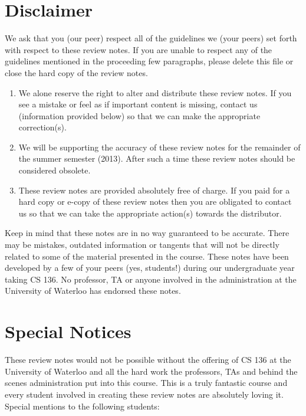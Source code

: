 \section*{Disclaimer}

We ask that you (our peer) respect all of the guidelines we (your peers) set forth with respect to these review notes. If you are unable to respect any of the guidelines mentioned in the proceeding few paragraphs, please delete this file or close the hard copy of the review notes.\\

\begin{enumerate}

\item We alone reserve the right to alter and distribute these review notes. If you see a mistake or feel as if important content is missing, contact us (information provided below) so that we can make the appropriate correction(s).

\item We will be supporting the accuracy of these review notes for the remainder of the summer semester (2013). After such a time these review notes should be considered obsolete.

\item These review notes are provided absolutely free of charge. If you paid for a hard copy or e-copy of these review notes then you are obligated to contact us so that we can take the appropriate action(s) towards the distributor.

\end{enumerate}

Keep in mind that these notes are in no way guaranteed to be accurate. There may be mistakes, outdated information or tangents that will not be directly related to some of the material presented in the course. These notes have been developed by a few of your peers (yes, students!) during our undergraduate year taking CS 136. No professor, TA or anyone involved in the administration at the University of Waterloo has endorsed these notes.

\section*{Special Notices}

These review notes would not be possible without the offering of CS 136 at the University of Waterloo and all the hard work the professors, TAs and behind the scenes administration put into this course. This is a truly fantastic course and every student involved in creating these review notes are absolutely loving it. Special mentions to the following students:


